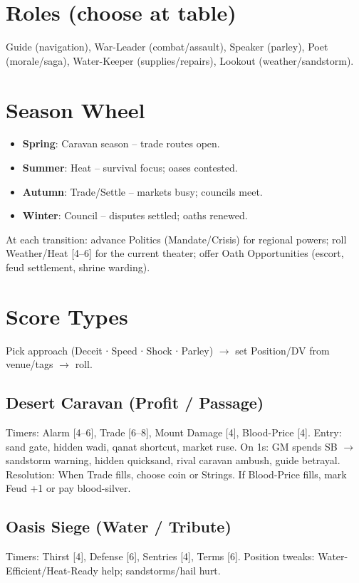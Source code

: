 \documentclass[12pt,oneside]{book}
\begin{document}
\section*{Roles (choose at table)}
Guide (navigation), War-Leader (combat/assault), Speaker (parley), Poet (morale/saga), Water-Keeper (supplies/repairs), Lookout (weather/sandstorm).

\section*{Season Wheel}
\begin{itemize}
  \item \textbf{Spring}: Caravan season -- trade routes open.
  \item \textbf{Summer}: Heat -- survival focus; oases contested.
  \item \textbf{Autumn}: Trade/Settle -- markets busy; councils meet.
  \item \textbf{Winter}: Council -- disputes settled; oaths renewed.
\end{itemize}
At each transition: advance Politics (Mandate/Crisis) for regional powers; roll Weather/Heat [4--6] for the current theater; offer Oath Opportunities (escort, feud settlement, shrine warding).

\section*{Score Types}
Pick approach (Deceit ∙ Speed ∙ Shock ∙ Parley) $\rightarrow$ set Position/DV from venue/tags $\rightarrow$ roll.

\subsection*{Desert Caravan (Profit / Passage)}
Timers: Alarm [4--6], Trade [6--8], Mount Damage [4], Blood-Price [4].  
Entry: sand gate, hidden wadi, qanat shortcut, market ruse.  
On 1s: GM spends SB $\rightarrow$ sandstorm warning, hidden quicksand, rival caravan ambush, guide betrayal.  
Resolution: When Trade fills, choose coin or Strings. If Blood-Price fills, mark Feud +1 or pay blood-silver.

\subsection*{Oasis Siege (Water / Tribute)}
Timers: Thirst [4], Defense [6], Sentries [4], Terms [6].  
Position tweaks: Water-Efficient/Heat-Ready help; sandstorms/hail hurt.
\end{document}
